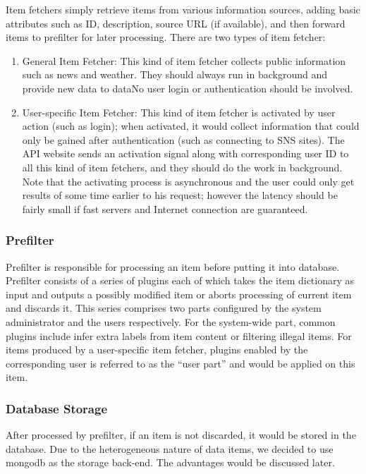 Item fetchers simply retrieve items from various information sources,
adding basic attributes such as ID, description, source URL (if
available), and then forward items to prefilter for later processing.
There are two types of item fetcher:

\begin{enumerate}
\def\labelenumi{\arabic{enumi}.}
\itemsep1pt\parskip0pt
\item
  General Item Fetcher: This kind of item fetcher collects public
  information such as news and weather. They should always run in
  background and provide new data to dataNo user login or authentication
  should be involved.
\item
  User-specific Item Fetcher: This kind of item fetcher is activated by
  user action (such as login); when activated, it would collect
  information that could only be gained after authentication (such as
  connecting to SNS sites). The API website sends an activation signal
  along with corresponding user ID to all this kind of item fetchers,
  and they should do the work in background. Note that the activating
  process is asynchronous and the user could only get results of some
  time earlier to his request; however the latency should be fairly
  small if fast servers and Internet connection are guaranteed.
\end{enumerate}

\subsubsection{Prefilter}

Prefilter is responsible for processing an item before putting it into
database. Prefilter consists of a series of plugins each of which takes
the item dictionary as input and outputs a possibly modified item or
aborts processing of current item and discards it. This series comprises
two parts configured by the system administrator and the users
respectively. For the system-wide part, common plugins include infer
extra labels from item content or filtering illegal items. For items
produced by a user-specific item fetcher, plugins enabled by the
corresponding user is referred to as the ``user part'' and would be
applied on this item.

\subsubsection{Database Storage}

After processed by prefilter, if an item is not discarded, it would be
stored in the database. Due to the heterogeneous nature of data items,
we decided to use mongodb as the storage back-end. The advantages would
be discussed later.

